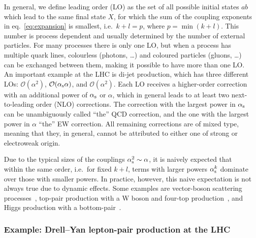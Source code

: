 In general, we define leading order (LO) as the set of all possible initial states $a b$ which lead to the same final state $X$, for which the sum of the coupling exponents in eq.~\eqref{eq:expansion} is smallest, i.e.\ $k + l = p$, where $p = \min (k+l)$.
This number is process dependent and usually determined by the number of external particles.
For many processes there is only one LO, but when a process has multiple quark lines, colourless (photons, \dots) and coloured particles (gluons, \ldots) can be exchanged between them, making it possible to have more than one LO.
An important example at the LHC is di-jet production, which has three different LOs: $\mathcal{O} (\alpha^2)$, $\mathcal{O} (\alpha_\mathrm{s} \alpha)$, and $\mathcal{O} (\alpha^2)$.
Each LO receives a higher-order correction with an additional power of $\alpha_\mathrm{s}$ or $\alpha$, which in general leads to at least two next-to-leading order (NLO) corrections.
The correction with the largest power in $\alpha_\mathrm{s}$ can be unambiguously called \enquote{the} QCD correction, and the one with the largest power in $\alpha$ \enquote{the} EW correction.
All remaining corrections are of mixed type, meaning that they, in general, cannot be attributed to either one of strong or electroweak origin.

Due to the typical sizes of the couplings $\alpha_\mathrm{s}^2 \sim \alpha$, it is naively expected that within the same order, i.e.\ for fixed $k + l$, terms with larger powers $\alpha_\mathrm{s}^k$ dominate over those with smaller powers.
In practice, however, this naive expectation is not always true due to dynamic effects.
Some examples are vector-boson scattering processes~\cite{Biedermann:2017bss,Denner:2019tmn}, top-pair production with a W boson and four-top production~\cite{Frederix:2017wme}, and Higgs production with a bottom-pair~\cite{Pagani:2020rsg}.

\subsubsection{Example: Drell--Yan lepton-pair production at the LHC}
\label{sec:pineappl-example}

